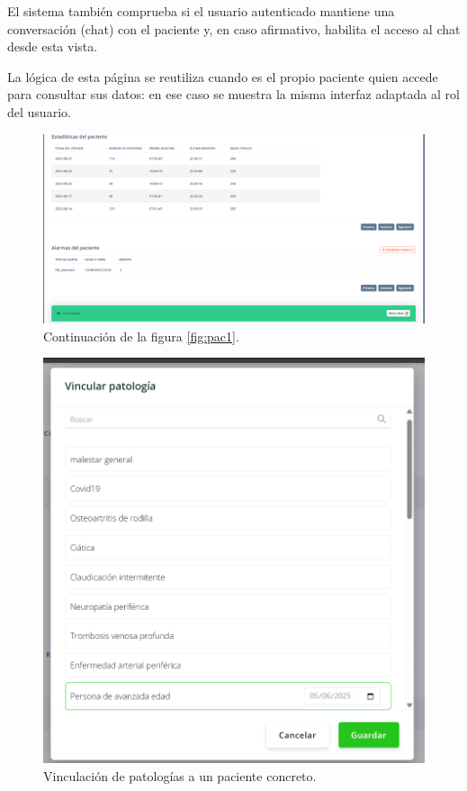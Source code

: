 \documentclass[12pt, a4paper]{article}
\begin{document}
\begin{umaappendices}
		El sistema también comprueba si el usuario autenticado mantiene una conversación (chat) con el paciente y, en caso afirmativo, habilita el acceso al chat desde esta vista.
		
		La lógica de esta página se reutiliza cuando es el propio paciente quien accede para consultar sus datos: en ese caso se muestra la misma interfaz adaptada al rol del usuario.
		

		
		\begin{figure}[htbp]
			\centering
			\includegraphics[width=1\textwidth]{images/6_patientID2.png}
			\caption[Ejemplo]{Continuación de la figura \ref{fig:pac1}.}
			\label{fig:pac2}
		\end{figure}

		\begin{figure}[htbp]
			\centering
			\includegraphics[width=1\textwidth]{images/7_vincular.png}
			\caption[Ejemplo]{Vinculación de patologías a un paciente concreto.}
			\label{fig:pato}
		\end{figure}
			

\end{umaappendices}
\end{document}
